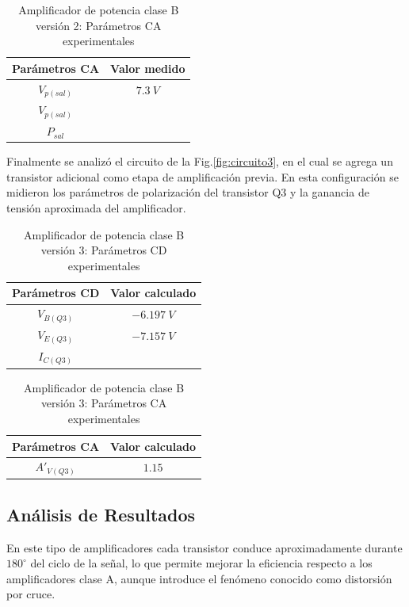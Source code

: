 \documentclass[journal]{IEEEtran}
\begin{document}
\begin{table}[H]
\centering
\caption{Amplificador de potencia clase B versión 2: Parámetros CA experimentales}
\label{tab:ca_version2_exp}
\begin{tabular}{|c|c|}
\hline
Parámetros CA & Valor medido  \\
\hline
$V_{p (sal)}$ & $7.3\ V$ \\
\hline
$V_{p (sal)}$ & \cellcolor{gray!85} \\
\hline
$P_{sal}$ & \cellcolor{gray!85} \\
\hline
\end{tabular}
\end{table}

Finalmente se analizó el circuito de la Fig.\ref{fig:circuito3}, en el cual se agrega un transistor adicional como etapa de amplificación previa. En esta configuración se midieron los parámetros de polarización del transistor Q3 y la ganancia de tensión aproximada del amplificador.

\begin{table}[H]
\centering
\caption{Amplificador de potencia clase B versión 3: Parámetros CD experimentales}
\label{tab:cd_version3_exp}
\begin{tabular}{|c|c|}
\hline
Parámetros CD & Valor calculado  \\
\hline
$V_{B (Q3)}$ & $-6.197\ V$ \\
\hline
$V_{E (Q3)}$ & $-7.157\ V$ \\
\hline
$I_{C (Q3)}$ & \cellcolor{gray!85} \\
\hline
\end{tabular}
\end{table}

\begin{table}[H]
\centering
\caption{Amplificador de potencia clase B versión 3: Parámetros CA experimentales}
\label{tab:ca_version3_exp}
\begin{tabular}{|c|c|}
\hline
Parámetros CA & Valor calculado  \\
\hline
$A'_{V (Q3)}$ & $1.15$ \\
\hline
\end{tabular}
\end{table}


\subsection{Análisis de Resultados}
En este tipo de amplificadores cada transistor conduce aproximadamente durante $180^\circ$ del ciclo de la señal, lo que permite mejorar la eficiencia respecto a los amplificadores clase A, aunque introduce el fenómeno conocido como distorsión por cruce. \cite{Floyd2008}\\
\end{document}

